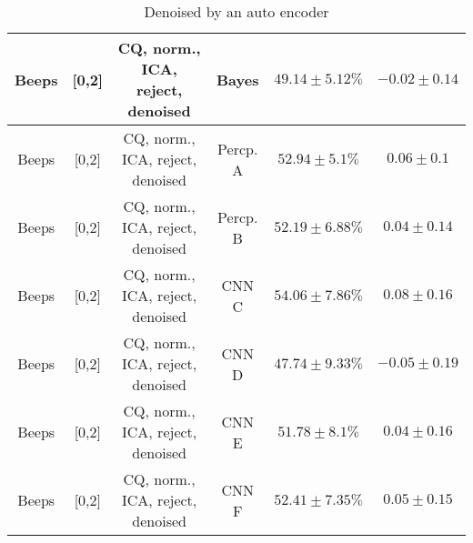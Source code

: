 \begin{table}[!htb]
{\begin{tabular}{c|c|c|c|c|c}
    \hline
    Beeps               & [0,2]                                         & \scriptsize{CQ, norm., ICA, reject, denoised}  & Bayes                 &  $49.14 \pm 5.12\%$   & $-0.02 \pm 0.14$\\ 
    \hline
    Beeps               & [0,2]                                         & \scriptsize{CQ, norm., ICA, reject, denoised}  & Percp. A              &  $52.94 \pm 5.1\%$    & $0.06 \pm 0.1$\\   
    \hline
    Beeps               & [0,2]                                         & \scriptsize{CQ, norm., ICA, reject, denoised}  & Percp. B              &  $52.19 \pm 6.88\%$   & $0.04 \pm 0.14$\\  
    \hline
    Beeps               & [0,2]                                         & \scriptsize{CQ, norm., ICA, reject, denoised}  & CNN C                 &  $54.06 \pm 7.86\%$   & $0.08 \pm 0.16$\\ 
    \hline
    Beeps               & [0,2]                                         & \scriptsize{CQ, norm., ICA, reject, denoised}  & CNN D                 &  $47.74 \pm 9.33\%$   & $-0.05 \pm 0.19$\\ 
    \hline
    Beeps               & [0,2]                                         & \scriptsize{CQ, norm., ICA, reject, denoised}  & CNN E                 &  $51.78 \pm 8.1\%$    & $0.04 \pm 0.16$\\ 
    \hline
    Beeps               & [0,2]                                         & \scriptsize{CQ, norm., ICA, reject, denoised}  & CNN F                 &  $52.41 \pm 7.35\%$   & $0.05 \pm 0.15$\\ 
    \hline
\end{tabular}
}
\caption{Denoised by an auto encoder}
\label{tab:sound-denoised+reject-app}
\end{table}